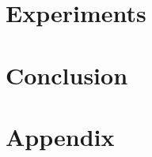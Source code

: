 \documentclass{llncs}
\begin{document}

%

\section{Experiments}\label{sec:exp}


\section{Conclusion}



\section*{Appendix}







\end{document}
